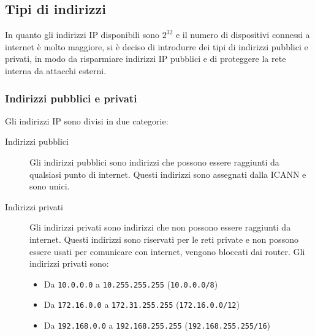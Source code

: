     \subsection{Tipi di indirizzi}
        In quanto gli indirizzi \Acrshort*{IP} disponibili sono $2^{32}$ e il numero di dispositivi connessi a internet è molto maggiore, si è deciso di introdurre dei tipi di indirizzi pubblici e privati, in modo da risparmiare indirizzi \Acrshort*{IP} pubblici e di proteggere la rete interna da attacchi esterni.
        \subsubsection{Indirizzi pubblici e privati}
            Gli indirizzi \Acrshort*{IP} sono divisi in due categorie: \begin{description}
                \item[Indirizzi pubblici] Gli indirizzi pubblici sono indirizzi che possono essere raggiunti da qualsiasi punto di internet. Questi indirizzi sono assegnati dalla \Acrshort*{ICANN} e sono unici.
                \item[Indirizzi privati] Gli indirizzi privati sono indirizzi che non possono essere raggiunti da internet. Questi indirizzi sono riservati per le reti private e non possono essere usati per comunicare con internet, vengono bloccati dai router. Gli indirizzi privati sono: \begin{itemize}
                    \item Da \texttt{10.0.0.0} a \texttt{10.255.255.255} (\texttt{10.0.0.0/8})
                    \item Da \texttt{172.16.0.0} a \texttt{172.31.255.255} (\texttt{172.16.0.0/12})
                    \item Da \texttt{192.168.0.0} a \texttt{192.168.255.255} (\texttt{192.168.255.255/16})
                \end{itemize}
            \end{description}
